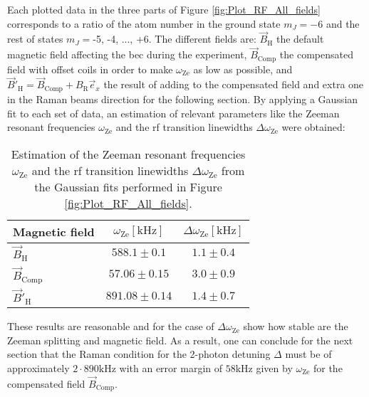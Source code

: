 \pagebreak

Each plotted data in the three parts of Figure \ref{fig:Plot_RF_All_fields} corresponds to a ratio of the atom number in the ground state $m_J = -6$ and the rest of states $m_J = $-5, -4, ..., +6. The different fields are: $\vec{B}_\text{H}$ the default magnetic field affecting the \ac{bec} during the experiment, $\vec{B}_\text{Comp}$ the compensated field with offset coils in order to make $\omega_\text{Ze}$ as low as possible, and $\vec{B}'_\text{H} = \vec{B}_\text{Comp} +B_\text{R}\vec{e}_x$ the result of adding to the compensated field and extra one in the Raman beams direction for the following section. By applying a Gaussian fit to each set of data, an estimation of relevant parameters like the Zeeman resonant frequencies $\omega_\text{Ze}$ and the \ac{rf} transition linewidths $\Delta \omega_\text{Ze}$ were obtained:

\begin{table}[htbp] \centering
	\begin{tabular}{@{}l|c|c@{}}\hline
	Magnetic field	                  & $\omega_\text{Ze} [\si{\kilo\hertz}]$           & $\Delta \omega_\text{Ze} [\si{\kilo\hertz}]$ \\ \hline\hline
	$\vec{B}_\text{H}$	     &  $588.1 \pm 0.1 $   & $1.1 \pm 0.4 $        \\
	$\vec{B}_\text{Comp}$	 &  $57.06 \pm 0.15 $  & $3.0 \pm 0.9 $        \\ 
	$\vec{B}'_\text{H}$	     &  $891.08 \pm 0.14 $ & $1.4 \pm 0.7 $       \\\hline
	\end{tabular}
	\caption[Estimation of the Zeeman resonant frequencies $\omega_\text{Ze}$ and the \ac{rf} transition linewidths $\Delta \omega_\text{Ze}$]{Estimation of the Zeeman resonant frequencies $\omega_\text{Ze}$ and the \ac{rf} transition linewidths $\Delta \omega_\text{Ze}$ from the Gaussian fits performed in Figure \ref{fig:Plot_RF_All_fields}.}
	\label{tab:results_Plot_RF_All_fields}
\end{table}

These results are reasonable and for the case of $\Delta \omega_\text{Ze}$ show how stable are the Zeeman splitting and magnetic field. As a result, one can conclude for the next section that the Raman condition for the 2-photon detuning $\Delta$ must be of approximately $2\cdot890\si{\kilo\hertz}$ with an error margin of $58\si{\kilo\hertz}$ given by $\omega_\text{Ze}$ for the compensated field $\vec{B}_\text{Comp}$.

